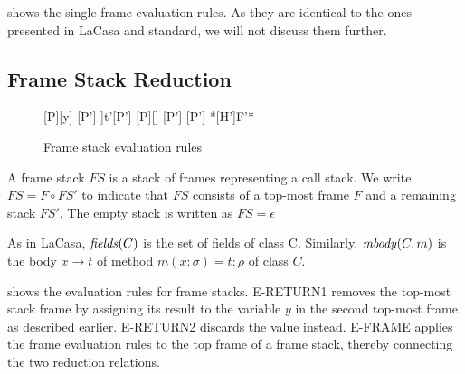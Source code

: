  shows the single frame evaluation rules. As they are identical to the ones presented in LaCasa and standard, we will not discuss them further.


\subsection{Frame Stack Reduction}
\begin{figure}
\infrule[E-RETURN1]{}
    {\reducstack
        {[P][y] \circ {}[P']}
        {\sframe[L'[y \rightarrow L(x)]]{t'}[P']}
    }
\vspace{3mm}
\infrule[E-RETURN2]{}
    {\reducstack
        {[P][\epsilon] \circ {}[P']}
        {[P']}
    }
\vspace{3mm}
    {*[H']{F'}*}
    \caption{Frame stack evaluation rules}
    \label{fig:frame-stack-evaluation}
\end{figure}

A frame stack $FS$ is a stack of frames representing a call stack. We write $FS = F \circ FS'$ to indicate that $FS$ consists of a top-most frame $F$ and a remaining stack $FS'$. The empty stack is written as $FS = \epsilon$

As in LaCasa, $\mathop{\mathit{fields}}(C)$ is the set of fields of class C. Similarly, $\mathop{\mathit{mbody}}(C, m)$ is the body $x \rightarrow t$ of method $m(x : \sigma) = t : \rho$ of class $C$.

 shows the evaluation rules for frame stacks. E-RETURN1 removes the top-most stack frame by assigning its result to the variable $y$ in the second top-most frame as described earlier. E-RETURN2 discards the value instead. E-FRAME applies the frame evaluation rules to the top frame of a frame stack, thereby connecting the two reduction relations.


